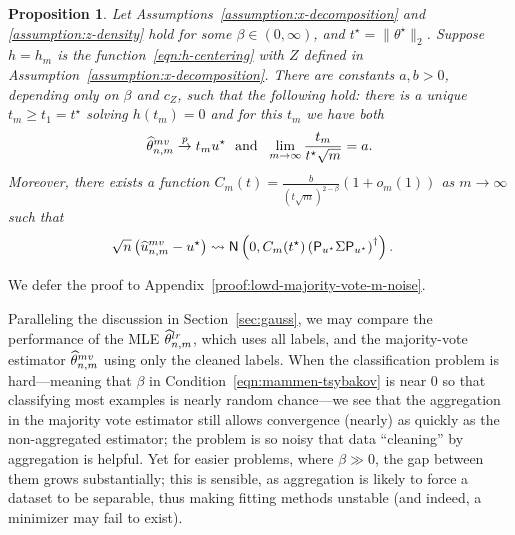 \documentclass[11pt]{article}
\newcommand{\prn}[1]{\left({#1}\right)} %
\newcommand{\what}[1]{\widehat{#1}}
\newcommand{\normal}{\mathsf{N}}
\newcommand{\lr}{^{\textup{lr}}}
\newcommand{\mv}{^{\textup{mv}}}
\newcommand{\proj}{\mathsf{P}}
\newcommand{\norms}[1]{\|{#1}\|} %
\newcommand{\ltwos}[1]{\norms{#1}_2} %
\newcommand{\<}{\langle} %
\renewcommand{\>}{\rangle}
\newcommand{\cd}{\rightsquigarrow}
\newcommand{\cp}{\stackrel{p}{\rightarrow}}
\newcommand{\opt}{^\star}
\newtheorem{proposition}{Proposition}
\begin{document}
\begin{proposition} \label{prop:lowd-majority-vote-m-noise}
	Let
	Assumptions~\ref{assumption:x-decomposition} and \ref{assumption:z-density} hold for some $\beta \in (0,
	\infty)$, and $t\opt = \ltwos{\theta\opt}$. Suppose $h = h_m$ is the
	function~\eqref{eqn:h-centering} with $Z$ defined in Assumption~\ref{assumption:x-decomposition}.  There are constants $a, b > 0$,
	depending only on $\beta$ and $c_Z$, such that the following hold: there is a unique
	$t_m \geq t_1 = t^\star$ solving $h(t_m) = 0$ and for this $t_m$ we have
	both
	\begin{equation*}
		\what{\theta}\mv_{n,m} \cp t_m u\opt
		~~ \mbox{and} ~~
		\lim_{m \to \infty} \frac{t_m}{t\opt \sqrt{m}} = a.
	\end{equation*}
	Moreover,
	there exists a function
	$C_m(t) = \frac{b}{(t \sqrt m)^{2 - \beta}}(1 + o_m(1))$
	as $m \to \infty$ such that
	\begin{align*}
		\sqrt{n} \left(\what{u}\mv_{n,m} - u^\star \right)
		&\cd \normal\left(0, C_m(t\opt) \prn{\proj_{u\opt} \Sigma \proj_{u\opt}}^\dagger\right).
	\end{align*}
\end{proposition}
\noindent
We defer the proof to Appendix~\ref{proof:lowd-majority-vote-m-noise}.

Paralleling the discussion in Section~\ref{sec:gauss}, we may compare the
performance of the MLE $\what{\theta}\lr_{n,m}$, which uses all labels, and
the majority-vote estimator $\what{\theta}\mv_{n,m}$ using only the cleaned
labels. When the classification problem is hard---meaning that
$\beta$ in Condition~\eqref{eqn:mammen-tsybakov} is near 0 so that
classifying most examples is nearly random chance---we see
that the aggregation in the majority vote estimator still allows
convergence (nearly) as quickly as the non-aggregated estimator; the
problem is so noisy that data ``cleaning'' by aggregation is helpful.
Yet for easier problems, where $\beta \gg 0$, the gap between them
grows substantially; this is sensible, as aggregation is likely to
force a dataset to be separable, thus making fitting methods
unstable (and indeed, a minimizer may fail to exist). 

\end{document}
